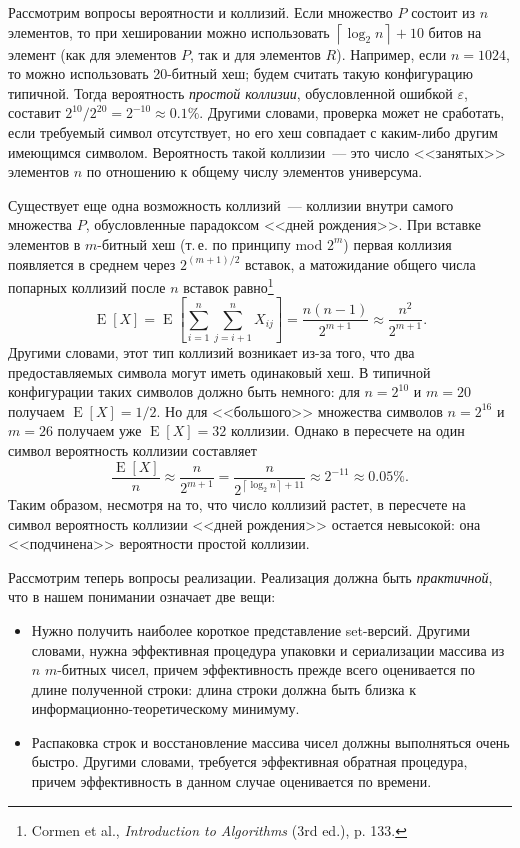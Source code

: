 \documentclass[russian,a4paper,12pt,titlepage]{article}
\begin{document}
Рассмотрим вопросы вероятности и коллизий.  Если множество $P$ состоит из $n$ элементов,
то при хешировании можно использовать $\left\lceil\log_2n\right\rceil+10$ битов на элемент
(как для элементов $P$, так и для элементов $R$).  Например, если $n=1024$, то можно использовать 20-битный хеш;
будем считать такую конфигурацию типичной.  Тогда вероятность \emph{простой коллизии}, обусловленной ошибкой $\varepsilon$,
составит $2^{10}/2^{20}=2^{-10}\approx0.1\%$.  Другими словами, проверка может не сработать, если требуемый символ
отсутствует, но его хеш совпадает с каким-либо другим имеющимся символом.  Вероятность такой коллизии~--- это
число <<занятых>> элементов $n$ по отношению к общему числу элементов универсума.

Существует еще одна возможность коллизий~--- коллизии внутри самого множества $P$, обусловленные парадоксом
<<дней рождения>>.  При вставке элементов в $m$-битный хеш (т.\,е. по принципу mod $2^m$) первая коллизия
появляется в среднем через $2^{(m+1)/2}$ вставок, а матожидание общего числа попарных коллизий
после $n$ вставок равно\footnote{Cormen et al., \textsl{Introduction to Algorithms} (3rd ed.), p. 133.}
$$\operatorname{E}[X]=\operatorname{E}\left[\sum_{i=1}^n\sum_{j=i+1}^n{X_{ij}}\right]=\frac{n(n-1)}{2^{m+1}}\approx\frac{n^2}{2^{m+1}}.$$
Другими словами, этот тип коллизий возникает из-за того, что два предоставляемых символа могут иметь
одинаковый хеш.  В типичной конфигурации таких символов должно быть немного: для $n=2^{10}$ и $m=20$ получаем
$\operatorname{E}[X]=1/2$.  Но для <<большого>> множества символов $n=2^{16}$ и $m=26$ получаем уже $\operatorname{E}[X]=32$ коллизии.
Однако в пересчете на один символ вероятность коллизии составляет
$$\frac{\operatorname{E}[X]}{n}\approx\frac{n}{2^{m+1}}=\frac{n}{2^{ \left\lceil\log_2n\right\rceil+11 }}\approx2^{-11}\approx0.05\%.$$
Таким образом, несмотря на то, что число коллизий растет, в пересчете на символ вероятность коллизии <<дней рождения>>
остается невысокой: она <<подчинена>> вероятности простой коллизии.

Рассмотрим теперь вопросы реализации.  Реализация должна быть \emph{практичной},
что в нашем понимании означает две вещи:
\begin{itemize}
\item Нужно получить наиболее короткое представление set-версий.  Другими словами, нужна эффективная процедура
упаковки и сериализации массива из $n$ $m$-битных чисел, причем эффективность прежде всего оценивается по длине
полученной строки: длина строки должна быть близка к информационно-теоретическому минимуму.
\item Распаковка строк и восстановление массива чисел должны выполняться очень быстро.  Другими словами,
требуется эффективная обратная процедура, причем эффективность в данном случае оценивается по времени.
\end{itemize}
\end{document}
